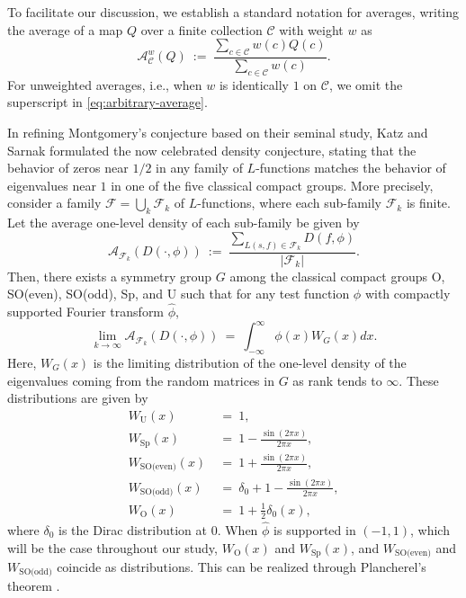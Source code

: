 \documentclass[12pt, reqno,oneside]{amsart}
\theoremstyle{plain}
\theoremstyle{definition}
\theoremstyle{remark}
\theoremstyle{plain}
\numberwithin{equation}{section}
\begin{document}
To facilitate our discussion, we establish a standard notation for averages, writing the average of a map $Q$ over a finite collection $\mathcal{C}$ with weight $w$ as 
\begin{equation}\label{eq:arbitrary-average}
\mathcal{A}^w_\mathcal{C}(Q) \ := \ \frac{\sum_{c\in\mathcal{C}}w(c)Q(c)}{\sum_{c\in\mathcal{C}}w(c)}.
\end{equation}
For unweighted averages, i.e., when $w$ is identically $1$ on $\mathcal{C}$, we omit the superscript in \eqref{eq:arbitrary-average}.

In refining Montgomery's conjecture based on their seminal study, Katz and Sarnak formulated the now celebrated density conjecture, stating that the behavior of zeros near $1/2$ in any family of $L$-functions matches the behavior of eigenvalues near $1$ in one of the five classical compact groups. More precisely, consider a family $\mathcal{F}=\bigcup_k \mathcal{F}_k$ of $L$-functions, where each sub-family $\mathcal{F}_k$ is finite. Let the average one-level density of each sub-family be given by
\begin{equation}\label{eq:family-density}
    \mathcal{A}_{\mathcal{F}_k}(D(\cdot,\phi)) \ := \ \frac{\sum_{L(s,f)\in\mathcal{F}_k}D(f,\phi)}{|\mathcal{F}_k|}.
\end{equation}
Then, there exists a symmetry group $G$ among the classical compact groups O, SO(even), SO(odd), Sp, and U such that for any test function $\phi$ with compactly supported Fourier transform $\widehat{\phi}$, 
\begin{equation}\label{eq:density-conjecture}
\lim_{k\to\infty} \mathcal{A}_{\mathcal{F}_k}(D(\cdot,\phi)) \ = \ \int_{-\infty}^\infty\phi(x)W_G(x)dx.
\end{equation}
Here, $W_G(x)$ is the limiting distribution of the one-level density of the eigenvalues coming from the random matrices in $G$ as rank tends to $\infty$. These distributions are given by
\begin{align}
    W_\text{U}(x) \ &= \ 1, \\
    W_\text{Sp}(x) \ &= \ 1-\frac{\sin(2\pi x)}{2\pi x}, \\
    W_\text{SO(even)}(x) \ &= \ 1+\frac{\sin(2\pi x)}{2\pi x}, \\
    W_\text{SO(odd)}(x) \ &= \ \delta_0+1-\frac{\sin(2\pi x)}{2\pi x}, \\
    W_\text{O}(x) \ &= \ 1+\frac{1}{2}\delta_0(x),
\end{align} 
where $\delta_0$ is the Dirac distribution at $0$. When $\widehat{\phi}$ is supported in $(-1,1)$, which will be the case throughout our study, $W_\text{O}(x)$ and $W_\text{Sp}(x)$, and $W_\text{SO(even)}$ and $W_\text{SO(odd)}$ coincide as distributions. This can be realized through Plancherel's theorem \cite[(1.34)]{ILS00}. 
\end{document}
